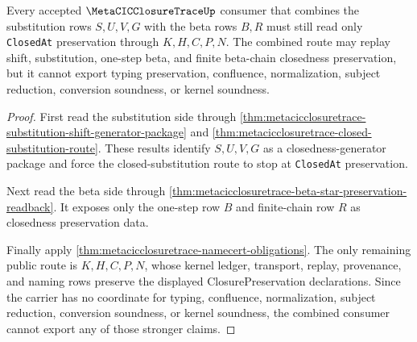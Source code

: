 \begin{theorem}
\label{thm:metacicclosuretrace-substitution-beta-chain-boundary}
Every accepted $\MetaCICClosureTraceUp$ consumer that combines the substitution rows $S,U,V,G$ with the beta rows $B,R$ must still read only \texttt{ClosedAt} preservation through $K,H,C,P,N$. The combined route may replay shift, substitution, one-step beta, and finite beta-chain closedness preservation, but it cannot export typing preservation, confluence, normalization, subject reduction, conversion soundness, or kernel soundness.
\end{theorem}
\begin{proof}
First read the substitution side through \autoref{thm:metacicclosuretrace-substitution-shift-generator-package} and \autoref{thm:metacicclosuretrace-closed-substitution-route}. These results identify $S,U,V,G$ as a closedness-generator package and force the closed-substitution route to stop at \texttt{ClosedAt} preservation.

Next read the beta side through \autoref{thm:metacicclosuretrace-beta-star-preservation-readback}. It exposes only the one-step row $B$ and finite-chain row $R$ as closedness preservation data.

Finally apply \autoref{thm:metacicclosuretrace-namecert-obligations}. The only remaining public route is $K,H,C,P,N$, whose kernel ledger, transport, replay, provenance, and naming rows preserve the displayed ClosurePreservation declarations. Since the carrier has no coordinate for typing, confluence, normalization, subject reduction, conversion soundness, or kernel soundness, the combined consumer cannot export any of those stronger claims.
\end{proof}

